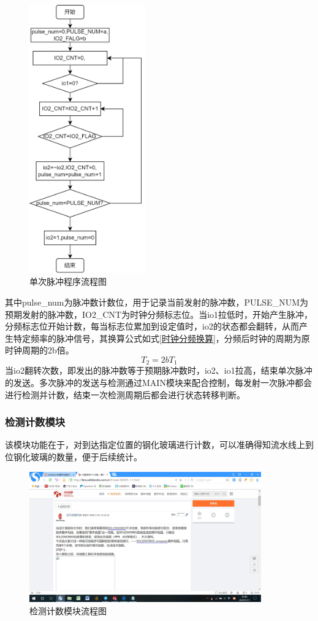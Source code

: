         
       \begin{figure}[ht]
        \centering
        \includegraphics[width=5cm]{figure/single pulse control.png}
        \caption{单次脉冲程序流程图}
        \label{单次脉冲程序流程图}
    \end{figure}

    其中pulse\_num为脉冲数计数位，用于记录当前发射的脉冲数，PULSE\_NUM为预期发射的脉冲数，IO2\_CNT为时钟分频标志位。当io1拉低时，开始产生脉冲，分频标志位开始计数，每当标志位累加到设定值时，io2的状态都会翻转，从而产生特定频率的脉冲信号，其换算公式如式\ref{时钟分频换算}，分频后时钟的周期为原时钟周期的2b倍。
    \begin{equation}
        T_2=2bT_1
    \label{时钟分频换算}
    \end{equation}
    当io2翻转次数，即发出的脉冲数等于预期脉冲数时，io2、io1拉高，结束单次脉冲的发送。多次脉冲的发送与检测通过MAIN模块来配合控制，每发射一次脉冲都会进行检测并计数，结束一次检测周期后都会进行状态转移判断。
    
  
    \subsubsection{检测计数模块}
    
    该模块功能在于，对到达指定位置的钢化玻璃进行计数，可以准确得知流水线上到位钢化玻璃的数量，便于后续统计。
    \begin{figure}[ht]
        \centering
        \includegraphics[width=10cm]{figure/1.jpg}
        {\caption{检测计数模块流程图}}
        \label{检测计数模块流程图}
    \end{figure}

